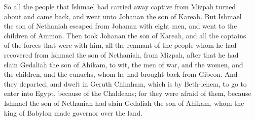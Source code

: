 So all the people that Ishmael had carried away captive from Mizpah turned about and came back, and went unto Johanan the son of Kareah. But Ishmael the son of Nethaniah escaped from Johanan with eight men, and went to the children of Ammon. Then took Johanan the son of Kareah, and all the captains of the forces that were with him, all the remnant of the people whom he had recovered from Ishmael the son of Nethaniah, from Mizpah, after that he had slain Gedaliah the son of Ahikam, to wit, the men of war, and the women, and the children, and the eunuchs, whom he had brought back from Gibeon. And they departed, and dwelt in Geruth Chimham, which is by Beth-lehem, to go to enter into Egypt, because of the Chaldeans; for they were afraid of them, because Ishmael the son of Nethaniah had slain Gedaliah the son of Ahikam, whom the king of Babylon made governor over the land. 


